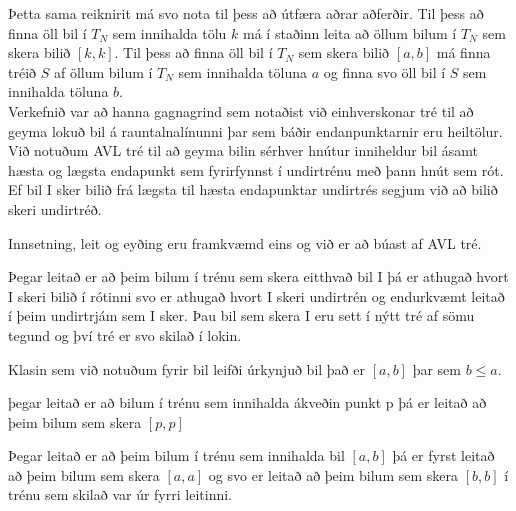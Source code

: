 \documentclass[a4paper,oneside]{article}
\begin{document}
Þetta sama reiknirit má svo nota til þess að útfæra aðrar aðferðir.
Til þess að finna öll bil í $T_N$ sem innihalda tölu $k$ má í staðinn leita að öllum bilum í $T_N$ sem skera bilið $[k,k]$.
Til þess að finna öll bil í $T_N$ sem skera bilið $[a,b]$ má finna tréið $S$ af öllum bilum í $T_N$ sem innihalda töluna $a$ og finna svo öll bil í $S$ sem innihalda töluna $b$.\\


Verkefnið var að hanna gagnagrind sem notaðist við einhverskonar tré til að geyma lokuð bil  á rauntalnalínunni þar sem báðir endanpunktarnir eru heiltölur.
Við notuðum AVL tré til að geyma bilin sérhver hnútur inniheldur bil ásamt hæsta og lægsta endapunkt sem fyrirfynnst í undirtrénu með þann hnút sem rót. 
Ef bil I  sker bilið frá lægsta til hæsta endapunktar undirtrés segjum við að bilið skeri undirtréð.

Innsetning, leit og eyðing eru framkvæmd eins og við er að búast af AVL tré.

Þegar leitað er að þeim bilum í trénu sem skera eitthvað bil I þá er athugað hvort I skeri bilið í rótinni 
svo er athugað hvort I skeri undirtrén og endurkvæmt leitað í þeim undirtrjám sem I sker.
Þau bil sem skera I eru sett í nýtt tré af sömu tegund og því tré er svo skilað í lokin.

Klasin sem við notuðum fyrir bil leifði úrkynjuð bil það er $[a,b]$ þar sem $b\leq a$.

þegar leitað er að bilum í trénu sem innihalda ákveðin punkt p  þá er leitað að þeim bilum sem skera  $[p,p]$ 

Þegar leitað er að þeim bilum í trénu sem innihalda bil $[a,b]$ þá er fyrst leitað að þeim bilum sem skera $[a,a]$ og svo er leitað að þeim bilum sem skera  $[b,b]$ í trénu sem skilað var úr fyrri leitinni.
\end{document}
